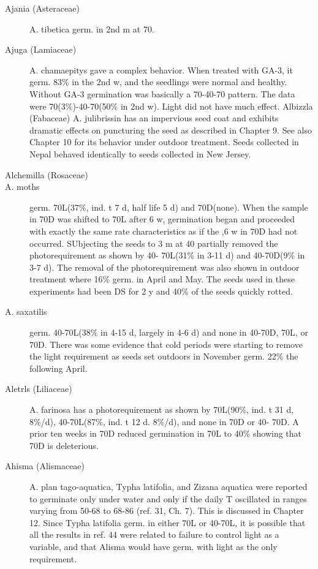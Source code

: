 \begin{description}
\item[Ajania (Asteraceae)] A. tibetica germ. in 2nd m at 70.
\item[Ajuga (Lamiaceae)] A. chamaepitys gave a complex behavior. When
treated with GA-3, it germ. 83\% in the 2nd w, and the seedlings were normal and
healthy. Without GA-3 germination was basically a 70-40-70 pattern. The data were
70(3\%)-40-70(50\% in 2nd w). Light did not have much effect.
Albizzla (Fabaceae) A. julibrissin has an impervious seed coat and
exhibits dramatic effects on puncturing the seed as described in Chapter 9. See also
Chapter 10 for its behavior under outdoor treatment. Seeds collected in Nepal
behaved identically to seeds collected in New Jersey.

\item[Alchemilla (Rosaceae)]
\item[A. moths] germ. 70L(37\%, ind. t 7 d, half life 5 d) and 70D(none). When the
sample in 70D was shifted to 70L after 6 w, germination began and proceeded with
exactly the same rate characteristics as if the ,6 w in 70D had not occurred. SUbjecting
the seeds to 3 m at 40 partially removed the photorequirement as shown by 40-
70L(31\% in 3-11 d) and 40-70D(9\% in 3-7 d). The removal of the photorequirement
was also shown in outdoor treatment where 16\% germ. in April and May. The seeds
used in these experiments had been DS for 2 y and 40\% of the seeds quickly rotted.
\item[A. saxatilis] germ. 40-70L(38\% in 4-15 d, largely in 4-6 d) and none in 40-70D,
70L, or 70D. There was some evidence that cold periods were starting to remove the
light requirement as seeds set outdoors in November germ. 22\% the following April.
\item[Aletrls (Liliaceae)] A. farinosa has a photorequirement as shown by
70L(90\%, ind. t 31 d, 8\%/d), 40-70L(87\%, ind. t 12 d. 8\%/d), and none in 70D or 40-
70D. A prior ten weeks in 70D reduced germination in 70L to 40\% showing that 70D
is deleterious.
\item[Ahisma (Alismaceae)] A. plan tago-aquatica, Typha latifolia, and Zizana
aquatica were reported to germinate only under water and only if the daily T oscillated
in ranges varying from 50-68 to 68-86 (ref. 31, Ch. 7). This is discussed in Chapter 12.
Since Typha latifolia germ. in either 70L or 40-70L, it is possible that all the results in
ref. 44 were related to failure to control light as a variable, and that Alisma would have
germ. with light as the only requirement.


\end{description}
